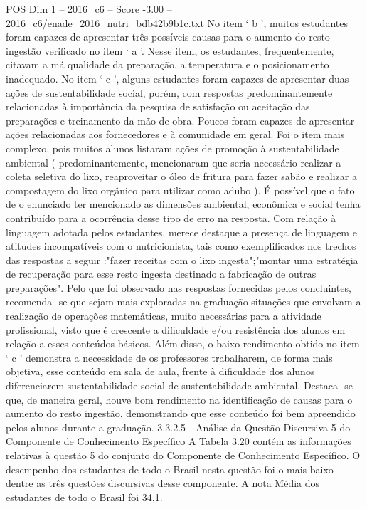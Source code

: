 \begin{textsample}{POS Dim 1 – 2016\_c6 – Score -3.00 – 2016\_c6/enade\_2016\_nutri\_bdb42b9b1c.txt}
No item ‘ b ’, muitos estudantes foram capazes de apresentar três possíveis causas para o aumento do resto ingestão verificado no item ‘ a ’.
Nesse item, os estudantes, frequentemente, citavam a má qualidade da preparação, a temperatura e o posicionamento inadequado.
No item ‘ c ’, alguns estudantes foram capazes de apresentar duas ações de sustentabilidade social, porém, com respostas predominantemente relacionadas à importância da pesquisa de satisfação ou aceitação das preparações e treinamento da mão de obra.
Poucos foram capazes de apresentar ações relacionadas aos fornecedores e à comunidade em geral.
Foi o item mais complexo, pois muitos alunos listaram ações de promoção à sustentabilidade ambiental ( predominantemente, mencionaram que seria necessário realizar a coleta seletiva do lixo, reaproveitar o óleo de fritura para fazer sabão e realizar a compostagem do lixo orgânico para utilizar como adubo ).
É possível que o fato de o enunciado ter mencionado as dimensões ambiental, econômica e social tenha contribuído para a ocorrência desse tipo de erro na resposta.
Com relação à linguagem adotada pelos estudantes, merece destaque a presença de linguagem e atitudes incompatíveis com o nutricionista, tais como exemplificados nos trechos das respostas a seguir :"fazer receitas com o lixo ingesta";"montar uma estratégia de recuperação para esse resto ingesta destinado a fabricação de outras preparações".
Pelo que foi observado nas respostas fornecidas pelos concluintes, recomenda -se que sejam mais exploradas na graduação situações que envolvam a realização de operações matemáticas, muito necessárias para a atividade profissional, visto que é crescente a dificuldade e/ou resistência dos alunos em relação a esses conteúdos básicos.
Além disso, o baixo rendimento obtido no item ‘ c ’ demonstra a necessidade de os professores trabalharem, de forma mais objetiva, esse conteúdo em sala de aula, frente à dificuldade dos alunos diferenciarem sustentabilidade social de sustentabilidade ambiental.
Destaca -se que, de maneira geral, houve bom rendimento na identificação de causas para o aumento do resto ingestão, demonstrando que esse conteúdo foi bem apreendido pelos alunos durante a graduação. 3.3.2.5 - Análise da Questão Discursiva 5 do Componente de Conhecimento Específico A Tabela 3.20 contém as informações relativas à questão 5 do conjunto do Componente de Conhecimento Específico.
O desempenho dos estudantes de todo o Brasil nesta questão foi o mais baixo dentre as três questões discursivas desse componente.
A nota Média dos estudantes de todo o Brasil foi 34,1.

\end{textsample}
